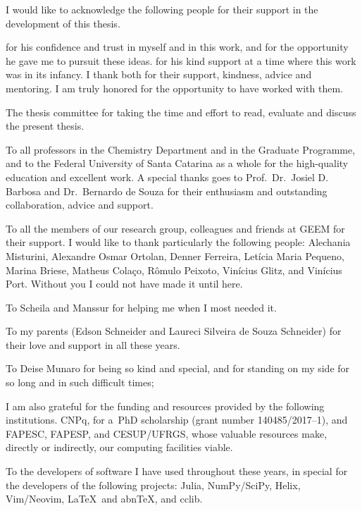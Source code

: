 \begin{agradecimentos}[Acknowledgements]
	I would like to acknowledge the following people for their support in the development of this thesis.

	\imprimirorientador{} for his confidence and trust in myself and in this work, and for the opportunity he gave me to pursuit these ideas.
	\imprimircoorientador{} for his kind support at a time where this work was in its infancy.
	I thank both for their support, kindness, advice and mentoring.
	I am truly honored for the opportunity to have worked with them.

	The thesis committee for taking the time and effort to read, evaluate and discuss the present thesis.

	To all professors in the Chemistry Department and in the Graduate Programme, and to the Federal University of Santa Catarina as a whole for the high-quality education and excellent work.
	A special thanks goes to Prof.\ Dr.\ Josiel D. Barbosa and Dr.\ Bernardo de Souza for their enthusiasm and outstanding collaboration, advice and support.

	To all the members of our research group, colleagues and friends at GEEM for their support.
	I would like to thank particularly the following people: Alechania Misturini, Alexandre Osmar Ortolan, Denner Ferreira, Letícia Maria Pequeno, Marina Briese, Matheus Colaço, Rômulo Peixoto, Vinícius Glitz, and Vinícius Port.
	Without you I could not have made it until here.

	To Scheila and Manssur for helping me when I most needed it.

	To my parents (Edson Schneider and Laureci Silveira de Souza Schneider) for their love and support in all these years.

	To Deise Munaro for being so kind and special, and for standing on my side for so long and in such difficult times;

	I am also grateful for the funding and resources provided by the following institutions.
	CNPq, for a~PhD scholarship (grant number 140485/2017--1), and FAPESC, FAPESP, and CESUP/UFRGS, whose valuable resources make, directly or indirectly, our computing facilities viable.

	To the developers of software I have used throughout these years, in special for the developers of the following projects: Julia, NumPy/SciPy, Helix, Vim/Neovim, \LaTeX\ and abn\TeX{}, and cclib.
\end{agradecimentos}

